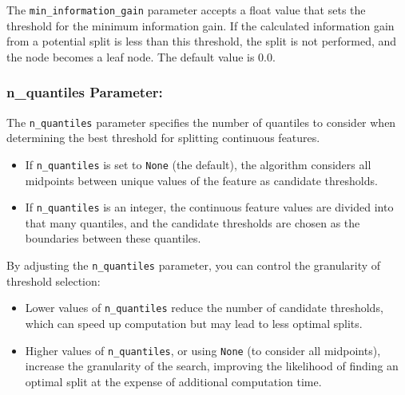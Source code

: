 \documentclass{article}
\begin{document}
The \texttt{min\_information\_gain} parameter accepts a float value that sets the threshold for the minimum information gain. If the calculated information gain from a potential split is less than this threshold, the split is not performed, and the node becomes a leaf node. The default value is 0.0.

\subsubsection*{n\_quantiles Parameter:}

The \texttt{n\_quantiles} parameter specifies the number of quantiles to consider when determining the best threshold for splitting continuous features. 

\begin{itemize}
    \item If \texttt{n\_quantiles} is set to \texttt{None} (the default), the algorithm considers all midpoints between unique values of the feature as candidate thresholds.
    \item If \texttt{n\_quantiles} is an integer, the continuous feature values are divided into that many quantiles, and the candidate thresholds are chosen as the boundaries between these quantiles.
\end{itemize}

By adjusting the \texttt{n\_quantiles} parameter, you can control the granularity of threshold selection:
\begin{itemize}
    \item Lower values of \texttt{n\_quantiles} reduce the number of candidate thresholds, which can speed up computation but may lead to less optimal splits.
    \item Higher values of \texttt{n\_quantiles}, or using \texttt{None} (to consider all midpoints), increase the granularity of the search, improving the likelihood of finding an optimal split at the expense of additional computation time.
\end{itemize}
\end{document}
